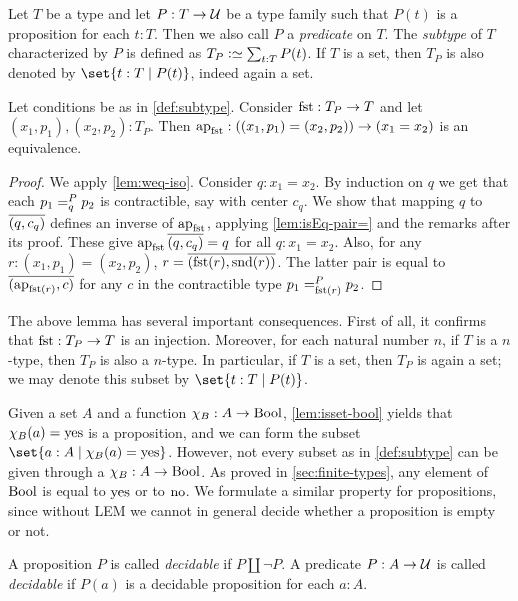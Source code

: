 \begin{definition}\label{def:subtype}
Let $T$ be a type and let $P: T\to{\mathcal{U}}$ be a type family such that
$P(t)$ is a proposition for each $t:T$. Then we also
call $P$ a \emph{predicate} on $T$.
The \emph{subtype} of $T$ characterized by $P$ is defined 
as $T_P\defeq \sum_{t:T} P(t)$.
If $T$ is a set, then $T_P$
is also denoted by $\set{t:T \mid P(t)}$, indeed again a set.
\end{definition}

\begin{lemma}\label{lem:subtype-same-level}\label{lem:subtype-eq-=}
Let conditions be as in \cref{def:subtype}. Consider $\fst: T_P \to T$
and let $(x_1,p_1),(x_2,p_2) : T_P$.
Then $\ap{\fst}: ((x_1,p_1) = (x_2,p_2)) \to (x_1 = x_2)$ is an equivalence.
\end{lemma}

\begin{proof}
We apply \cref{lem:weq-iso}. Consider $q: x_1 = x_2$.
By induction on $q$ we get that each $p_1 =^{P}_{q} p_2$ is contractible,
say with center $c_q$. We show that 
mapping $q$ to $\overline{({q},{c_q})}$ defines an inverse of $\ap{\fst}$,
applying \cref{lem:isEq-pair=} and the remarks after its proof.
These give $\ap{\fst}\pathpair q {c_q} = q$ for all $q: x_1 = x_2$.
Also, for any $r: (x_1,p_1)=(x_2,p_2)$, $r=\pathpair{\fst(r)}{\snd(r)}$.
The latter pair is equal to $\pathpair{\ap{\fst(r)}}{c}$ for any $c$
in the contractible type $\pathover {p_1} P {\fst(r)} {p_2}$.
\end{proof}
The above lemma has several important consequences.
First of all, it confirms that $\fst: T_P \to T$ is an injection.
Moreover, for each natural number $n$,
if $T$ is a $n$-type, then $T_P$ is also a $n$-type.
In particular, if $T$ is a set, then $T_P$ is again a set; 
we may denote this subset by $\set{t:T \mid P(t)}$. 

Given a set $A$ and a function $\chi_B: A\to\mathrm{Bool}$,
\cref{lem:isset-bool} yields that $\chi_B(a) = \mathrm{yes}$ is a
proposition, and we can form
the subset $\set{a:A \mid \chi_B(a) = \yes}$. However,
not every subset as in \cref{def:subtype} can be given
through a $\chi_B: A\to\mathrm{Bool}$. As proved in \cref{sec:finite-types},
any element of $\mathrm{Bool}$ is equal to $\mathrm{yes}$ or to $\mathrm{no}$.
We formulate a similar property for propositions, since without LEM
we cannot in general decide whether a proposition is empty or not.

\begin{definition}\label{def:decidability}
A proposition $P$ is called \emph{decidable} if $P\amalg\neg P$.
A predicate $P: A\to{\mathcal{U}}$ is called \emph{decidable} if 
$P(a)$ is a decidable proposition for each $a:A$.
\end{definition}

